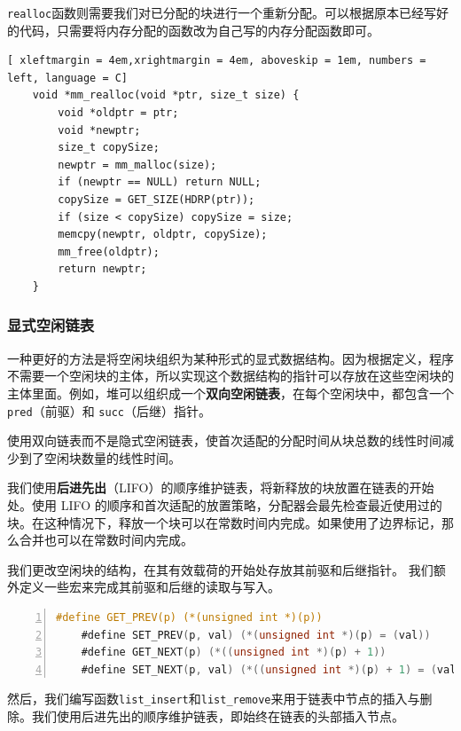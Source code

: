 \documentclass{article}
\begin{document}
\texttt{realloc}函数则需要我们对已分配的块进行一个重新分配。可以根据原本已经写好的代码，只需要将内存分配的函数改为自己写的内存分配函数即可。

\begin{lstlisting}[ xleftmargin = 4em,xrightmargin = 4em, aboveskip = 1em, numbers = left, language = C]
    void *mm_realloc(void *ptr, size_t size) {
        void *oldptr = ptr;
        void *newptr;
        size_t copySize;
        newptr = mm_malloc(size);
        if (newptr == NULL) return NULL;
        copySize = GET_SIZE(HDRP(ptr));
        if (size < copySize) copySize = size;
        memcpy(newptr, oldptr, copySize);
        mm_free(oldptr);
        return newptr;
    }
\end{lstlisting}
\subsubsection{显式空闲链表}

一种更好的方法是将空闲块组织为某种形式的显式数据结构。因为根据定义，程序不需要一个空闲块的主体，所以实现这个数据结构的指针可以存放在这些空闲块的主体里面。例如，堆可以组织成一个\textbf{双向空闲链表}，在每个空闲块中，都包含一个 \texttt{pred}（前驱）和 \texttt{succ}（后继）指针。

使用双向链表而不是隐式空闲链表，使首次适配的分配时间从块总数的线性时间减少到了空闲块数量的线性时间。

我们使用\textbf{后进先出}（LIFO）的顺序维护链表，将新释放的块放置在链表的开始处。使用 LIFO 的顺序和首次适配的放置策略，分配器会最先检查最近使用过的块。在这种情况下，释放一个块可以在常数时间内完成。如果使用了边界标记，那么合并也可以在常数时间内完成。

我们更改空闲块的结构，在其有效载荷的开始处存放其前驱和后继指针。
我们额外定义一些宏来完成其前驱和后继的读取与写入。

\begin{lstlisting}[xleftmargin = 4em,xrightmargin = 4em, aboveskip = 1em, numbers = left, language = C]
    #define GET_PREV(p) (*(unsigned int *)(p))
    #define SET_PREV(p, val) (*(unsigned int *)(p) = (val))
    #define GET_NEXT(p) (*((unsigned int *)(p) + 1))
    #define SET_NEXT(p, val) (*((unsigned int *)(p) + 1) = (val))
\end{lstlisting}

然后，我们编写函数\texttt{list\_insert}和\texttt{list\_remove}来用于链表中节点的插入与删除。我们使用后进先出的顺序维护链表，即始终在链表的头部插入节点。
\end{document}
